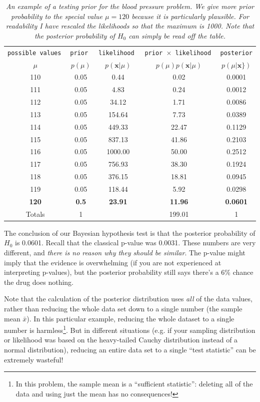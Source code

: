 \begin{table}[!ht]
\begin{center}
\begin{tabular}{|c|c|c|c|c|}
\hline
\tt{possible values} & \tt{prior} & \tt{likelihood} & \tt{prior} $\times$ \tt{likelihood} & \tt{posterior}\\
$\mu$ & $p(\mu)$ & $p(\boldsymbol{x}|\mu)$ & $p(\mu)p(\boldsymbol{x}|\mu)$ & $p(\mu|\boldsymbol{x}\})$\\
\hline
110 & 0.05 & 0.44	& 0.02 & 0.0001\\
111 & 0.05 & 4.83	& 0.24 & 0.0012\\
112 & 0.05 & 34.12	& 1.71 & 0.0086\\
113 & 0.05 & 154.64	& 7.73 & 0.0389\\
114 & 0.05 & 449.33	& 22.47 & 0.1129\\
115 & 0.05 & 837.13	& 41.86 & 0.2103\\
116 & 0.05 & 1000.00    & 50.00 & 0.2512\\
117 & 0.05 & 756.93	& 38.30 & 0.1924\\
118 & 0.05 & 376.15	& 18.81 & 0.0945\\
119 & 0.05 & 118.44	& 5.92 & 0.0298\\
{\bf 120} & {\bf 0.5}   & {\bf 23.91} & {\bf 11.96} & {\bf 0.0601}\\
\hline
Totals & 1 & & 199.01 & 1\\
\hline
\end{tabular}
\caption{\it An example of a testing prior for the blood pressure problem. We
give more prior probability to the special value $\mu=120$ because it is
particularly plausible. For readability I have rescaled the likelihoods so that
the maximum is 1000. Note that the posterior probability of $H_0$ can simply
be read off the table.
\label{tab:testing_prior}}
\end{center}
\end{table}

The conclusion of our Bayesian hypothesis test is that the posterior probability
of $H_0$ is 0.0601. Recall that the classical p-value was 0.0031. These numbers
are very different, and {\it there is no reason why they should be similar}. The
p-value might imply that the evidence is overwhelming (if you are not experienced
at interpreting p-values), but the posterior probability still says there's a
6\% chance the drug does nothing.

Note that the calculation of the posterior distribution uses {\it all} of the
data values, rather than reducing the whole data set down to a single number
(the sample mean $\bar{x}$). In this particular example, reducing the whole
dataset to a single number is harmless\footnote{In this problem, the sample mean
is a ``sufficient statistic'': deleting all of the data and using just the
mean has no consequences!}. But in different situations (e.g. if your sampling distribution
or likelihood was based on the heavy-tailed Cauchy distribution instead of a normal
distribution), reducing an entire data set to a single ``test statistic'' can
be extremely wasteful!

